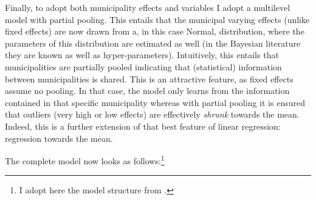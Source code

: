 \documentclass[fleqn,10pt]{SelfArx} %
\begin{document}
        Finally, to adopt both municipality effects and variables I adopt a
        multilevel model with partial pooling. This entails that the municipal
        varying effects (unlike fixed effects) are now drawn from a, in this
        case Normal, distribution, where the parameters of this distribution are
        estimated as well (in the Bayesian literature they are known as well as
        hyper-parameters).  Intuitively, this entails that municipalities are
        partially pooled indicating that (statistical) information between
        municipalities is shared. This is an attractive feature, as fixed
        effects assume no pooling. In that case, the model only learns from the
        information contained in that specific municipality whereas with partial
        pooling it is ensured that outliers (very high or low effects) are
        effectively \emph{shrunk} towards the mean. Indeed, this is a further
        extension of that best feature of linear regression: regression towards
        the mean.

        The complete model now looks as follows:\footnote{I adopt here the model structure from \citet{mcelreath2020statistical}.}
\end{document}
